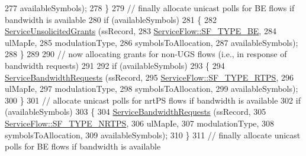 \begin{DoxyCode}
277                                             availableSymbols);
278                 \}
279               \textcolor{comment}{// finally allocate unicast polls for BE flows if bandwidth is available}
280               \textcolor{keywordflow}{if} (availableSymbols)
281                 \{
282                   \hyperlink{classns3_1_1UplinkSchedulerSimple_ab30024e72d773b5d0838b7d2222c8a1d}{ServiceUnsolicitedGrants} (ssRecord,
283                                             \hyperlink{classns3_1_1ServiceFlow_a7990ba10be1e098328fd1e6382a26235af93a8bd8fce654e688f957f6f362e5c7}{ServiceFlow::SF\_TYPE\_BE},
284                                             ulMapIe,
285                                             modulationType,
286                                             symbolsToAllocation,
287                                             availableSymbols);
288                 \}
289 
290               \textcolor{comment}{// now allocating grants for non-UGS flows (i.e., in response of bandwidth requests)}
291 
292               \textcolor{keywordflow}{if} (availableSymbols)
293                 \{
294                   \hyperlink{classns3_1_1UplinkSchedulerSimple_ad420cfa439ba7c319fab7dd0db299408}{ServiceBandwidthRequests} (ssRecord,
295                                             \hyperlink{classns3_1_1ServiceFlow_a7990ba10be1e098328fd1e6382a26235a0e98ff713b932a029acad7e5b24bbf55}{ServiceFlow::SF\_TYPE\_RTPS},
296                                             ulMapIe,
297                                             modulationType,
298                                             symbolsToAllocation,
299                                             availableSymbols);
300                 \}
301               \textcolor{comment}{// allocate unicast polls for nrtPS flows if bandwidth is available}
302               \textcolor{keywordflow}{if} (availableSymbols)
303                 \{
304                   \hyperlink{classns3_1_1UplinkSchedulerSimple_ad420cfa439ba7c319fab7dd0db299408}{ServiceBandwidthRequests} (ssRecord,
305                                             \hyperlink{classns3_1_1ServiceFlow_a7990ba10be1e098328fd1e6382a26235a7f8577f851a9f01d159442a3a3fcdf48}{ServiceFlow::SF\_TYPE\_NRTPS},
306                                             ulMapIe,
307                                             modulationType,
308                                             symbolsToAllocation,
309                                             availableSymbols);
310                 \}
311               \textcolor{comment}{// finally allocate unicast polls for BE flows if bandwidth is available}

\end{DoxyCode}
